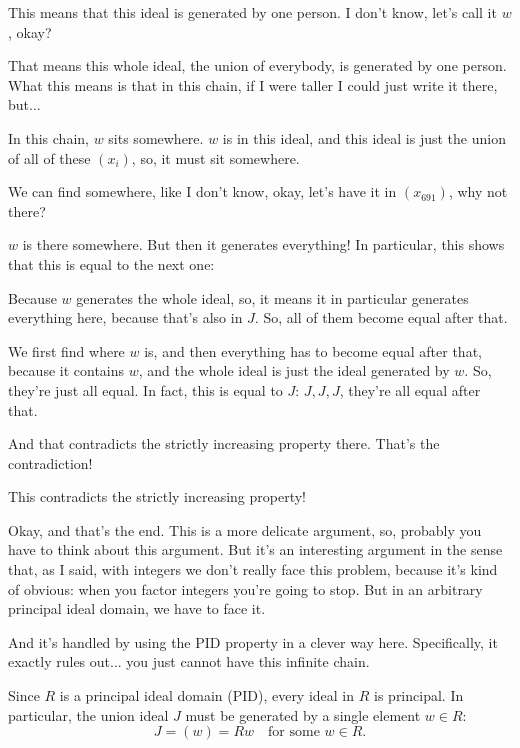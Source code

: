 \begin{proofWrapper}
\begin{speech}[01:12:09 - 01:14:44]
This means that this ideal is generated by one person. I don't know, let's call it $w$, okay?

That means this whole ideal, the union of everybody, is generated by one person. What this means is that in this chain, if I were taller I could just write it there, but... 

In this chain, $w$ sits somewhere. $w$ is in this ideal, and this ideal is just the union of all of these $(x_i)$, so, it must sit somewhere.

We can find somewhere, like I don't know, okay, let's have it in $(x_{691})$, why not there? 

$w$ is there somewhere. But then it generates everything! In particular, this shows that this is equal to the next one: 

Because $w$ generates the whole ideal, so, it means it in particular generates everything here, because that's also in $J$. So, all of them become equal after that.

We first find where $w$ is, and then everything has to become equal after that, because it contains $w$, and the whole ideal is just the ideal generated by $w$. So, they're just all equal. In fact, this is equal to $J$: $J, J, J$, they're all equal after that. 

And that contradicts the strictly increasing property there. That's the contradiction!

This contradicts the strictly increasing property! 

Okay, and that's the end. This is a more delicate argument, so, probably you have to think about this argument. But it's an interesting argument in the sense that, as I said, with integers we don't really face this problem, because it's kind of obvious: when you factor integers you're going to stop. But in an arbitrary principal ideal domain, we have to face it.

And it's handled by using the PID property in a clever way here. Specifically, it exactly rules out... you just cannot have this infinite chain.
\end{speech}

\begin{content}
Since $R$ is a principal ideal domain (PID), every ideal in $R$ is principal. In particular, the union ideal $J$ must be generated by a single element $w \in R$:
\begin{equation}\label{eq:part4-j-equals-w}
J = (w) = R w \quad \text{for some } w \in R.
\end{equation}


\end{content}
\end{proofWrapper}
